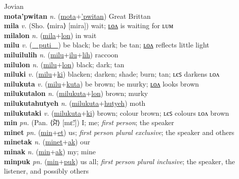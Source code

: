 Jovian \label{motapumak} \\
\textbf{mota'pwitan} \textit{n.} (\hyperref[mota]{mota}+\hyperref['pwitan]{'pwitan})
Great Brittan \label{mota'pwitan} \\
\textbf{mila} \textit{v.} (Sho. ⟨mira⟩ [mira])
wait; \hyperref[milalon]{ʟᴏᴧ} is waiting for ʟᴜᴍ \label{mila} \\
\textbf{milalon} \textit{n.} (\hyperref[mila]{mila}+\hyperref[lon]{lon})
in wait \label{milalon} \\
\textbf{milu} \textit{v.} (\hyperref[puti]{~~puti~~})
be black; be dark; be tan; \hyperref[milulon]{ʟᴏᴧ} reflects little light \label{milu} \\
\textbf{miluilulih} \textit{n.} (\hyperref[milu]{milu}+\hyperref[ilu]{ilu}+\hyperref[lih]{lih})
raccoon \label{miluilulih} \\
\textbf{milulon} \textit{n.} (\hyperref[milu]{milu}+\hyperref[lon]{lon})
black; dark; tan \label{milulon} \\
\textbf{miluki} \textit{v.} (\hyperref[milu]{milu}+\hyperref[ki]{ki})
blacken; darken; shade; burn; tan; ʟєꜱ darkens ʟᴏᴧ \label{miluki} \\
\textbf{milukuta} \textit{v.} (\hyperref[milu]{milu}+\hyperref[kuta]{kuta})
be brown; be murky; \hyperref[milukutalon]{ʟᴏᴧ} looks brown \label{milukuta} \\
\textbf{milukutalon} \textit{n.} (\hyperref[milukuta]{milukuta}+\hyperref[lon]{lon})
brown; murky \label{milukutalon} \\
\textbf{milukutahutyeh} \textit{n.} (\hyperref[milukuta]{milukuta}+\hyperref[hutyeh]{hutyeh})
moth \label{milukutahutyeh} \\
\textbf{milukutaki} \textit{v.} (\hyperref[milukuta]{milukuta}+\hyperref[ki]{ki})
brown; colour brown; ʟєꜱ colours ʟᴏᴧ brown \label{milukutaki} \\
\textbf{min} \textit{pn.} (Pan. ⟨ਮੈਂ⟩ [mɛ̃ː])
I; me; \textit{first person}; the speaker \label{min} \\
\textbf{minet} \textit{pn.} (\hyperref[min]{min}+\hyperref[et]{et})
us; \textit{first person plural exclusive}; the speaker and others \label{minet} \\
\textbf{minetak} \textit{n.} (\hyperref[minet]{minet}+\hyperref[ak]{ak})
our \label{minetak} \\
\textbf{minak} \textit{n.} (\hyperref[min]{min}+\hyperref[ak]{ak})
my; mine \label{minak} \\
\textbf{minpuk} \textit{pn.} (\hyperref[min]{min}+\hyperref[puk]{puk})
us all; \textit{first person plural inclusive}; the speaker, the listener, and possibly others \label{minpuk} \\
